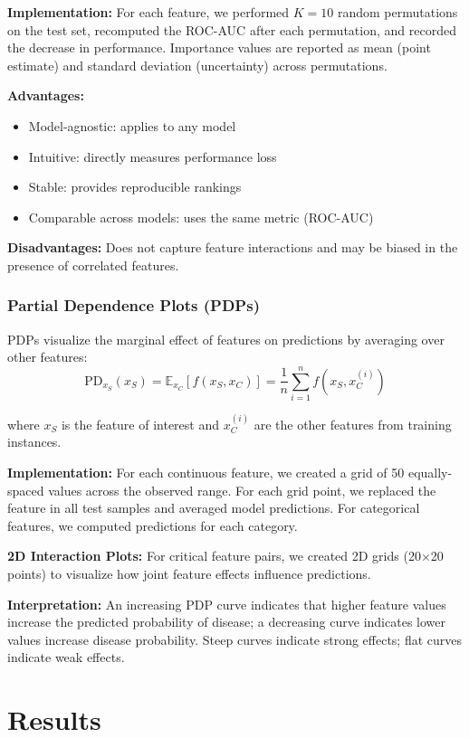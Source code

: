 \documentclass[journal]{IEEEtran}
\begin{document}
\textbf{Implementation:} For each feature, we performed $K = 10$ random permutations on the test set, recomputed the ROC-AUC after each permutation, and recorded the decrease in performance. Importance values are reported as mean (point estimate) and standard deviation (uncertainty) across permutations.

\textbf{Advantages:}
\begin{itemize}
    \item Model-agnostic: applies to any model
    \item Intuitive: directly measures performance loss
    \item Stable: provides reproducible rankings
    \item Comparable across models: uses the same metric (ROC-AUC)
\end{itemize}

\textbf{Disadvantages:} Does not capture feature interactions and may be biased in the presence of correlated features.

\subsubsection{Partial Dependence Plots (PDPs)}

PDPs visualize the marginal effect of features on predictions by averaging over other features:
\[
\text{PD}_{x_S}(x_S) = \mathbb{E}_{x_C}[f(x_S, x_C)] = \frac{1}{n}\sum_{i=1}^{n} f(x_S, x_C^{(i)})
\]

where $x_S$ is the feature of interest and $x_C^{(i)}$ are the other features from training instances.

\textbf{Implementation:} For each continuous feature, we created a grid of 50 equally-spaced values across the observed range. For each grid point, we replaced the feature in all test samples and averaged model predictions. For categorical features, we computed predictions for each category.

\textbf{2D Interaction Plots:} For critical feature pairs, we created 2D grids (20×20 points) to visualize how joint feature effects influence predictions.

\textbf{Interpretation:} An increasing PDP curve indicates that higher feature values increase the predicted probability of disease; a decreasing curve indicates lower values increase disease probability. Steep curves indicate strong effects; flat curves indicate weak effects.

\section{Results}\label{sec:results}
\end{document}
